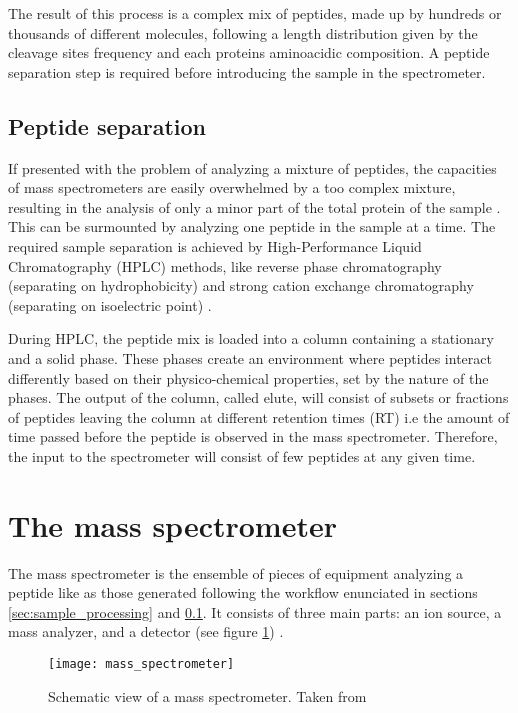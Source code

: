 The result of this process is a complex mix of peptides, made up by hundreds or thousands of different molecules, following a length distribution given by the cleavage sites frequency and each protein\textquotesingle s aminoacidic composition. A peptide separation step is required before introducing the sample in the spectrometer.

\subsection{Peptide separation}
\label{subsec:peptide_separation}

If presented with the problem of analyzing a mixture of peptides, the capacities of mass spectrometers are easily overwhelmed by a too complex mixture, resulting in the analysis of only a minor part of the total protein of the sample \cite{Barsnes2008}. This can be surmounted by analyzing one peptide in the sample at a time. The required sample separation is achieved by High-Performance Liquid Chromatography (\ac{HPLC}) methods, like reverse phase chromatography (separating on hydrophobicity) and strong cation exchange chromatography (separating on isoelectric point) \cite{Barsnes2008}.

During \ac{HPLC}, the peptide mix is loaded into a column containing a stationary and a solid phase. These phases create an environment where peptides interact differently based on their physico-chemical properties, set by the nature of the phases. The output of the column, called elute, will consist of subsets or fractions of peptides leaving the column at different retention times (\ac{RT}) i.e the amount of time passed before the peptide is observed in the mass spectrometer. Therefore, the input to the spectrometer will consist of few peptides at any given time.

\section{The mass spectrometer}
\label{sec:the_mass_spectrometer}

The mass spectrometer is the ensemble of pieces of equipment analyzing a peptide like as those generated following the workflow enunciated in sections \ref{sec:sample_processing} and \ref{subsec:peptide_separation}. It consists of three main parts: an ion source, a mass analyzer, and a detector (see figure \ref{fig:mass_spectrometer}) \cite{Barsnes2008}.

\begin{figure}[!h]
\texttt{[image: mass\_spectrometer]}
\caption[Mass spectrometer diagram]{Schematic view of a mass spectrometer. Taken from \footnotemark{}}
\label{fig:mass_spectrometer}
\end{figure}

